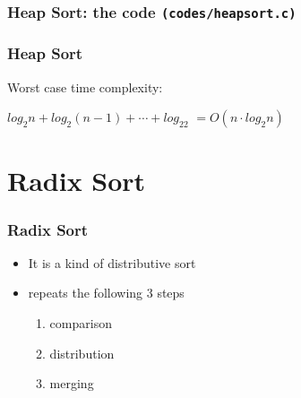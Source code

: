 \documentclass[newPxFont,sthlmFooter,nooffset]{beamer}
\begin{document}
\begin{frame}
  \frametitle{Heap Sort: the code \texttt{(codes/heapsort.c)}}
    
\end{frame}


\begin{frame}[t]
  \frametitle{Heap Sort}
Worst case time complexity:

$log_2n + log_2(n-1) + \cdots + log_22$
$=O(n\cdot log_2n)$
\end{frame}


\section{Radix Sort}
\begin{frame}[t]
  \frametitle{Radix Sort}
  \begin{itemize}
  \item It is a kind of distributive sort
  \item repeats the following 3 steps
    \begin{enumerate}
    \item comparison
    \item distribution
    \item merging
    \end{enumerate}

  \end{itemize}
\end{frame}
\end{document}
